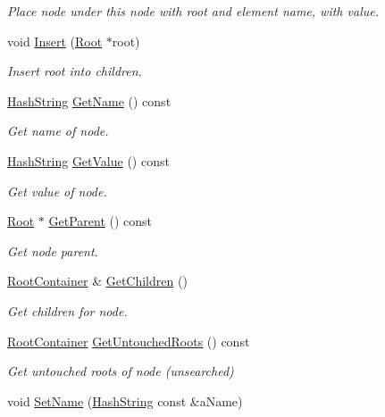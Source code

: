 \begin{DoxyCompactItemize}
\begin{DoxyCompactList}\small\item\em Place node under this node with root and element name, with value. \end{DoxyCompactList}\item 
void \hyperlink{classRoot_a60275ee59c14bae93b173067a9186dab}{Insert} (\hyperlink{classRoot}{Root} $\ast$root)
\begin{DoxyCompactList}\small\item\em Insert root into children. \end{DoxyCompactList}\item 
\hyperlink{classHashString}{Hash\+String} \hyperlink{classRoot_a97bcc25c8b962a681cb53096b0585a28}{Get\+Name} () const 
\begin{DoxyCompactList}\small\item\em Get name of node. \end{DoxyCompactList}\item 
\hyperlink{classHashString}{Hash\+String} \hyperlink{classRoot_ab1c77a4b9fbc54ace8ec611fdc5b150d}{Get\+Value} () const 
\begin{DoxyCompactList}\small\item\em Get value of node. \end{DoxyCompactList}\item 
\hyperlink{classRoot}{Root} $\ast$ \hyperlink{classRoot_a3e976ce215650faeda13959b75764108}{Get\+Parent} () const 
\begin{DoxyCompactList}\small\item\em Get node parent. \end{DoxyCompactList}\item 
\hyperlink{Root_8h_aba37b6ece0d9fb5495482ccd0e0f272e}{Root\+Container} \& \hyperlink{classRoot_a02a74cccccdd6627072949b64551e58a}{Get\+Children} ()
\begin{DoxyCompactList}\small\item\em Get children for node. \end{DoxyCompactList}\item 
\hyperlink{Root_8h_aba37b6ece0d9fb5495482ccd0e0f272e}{Root\+Container} \hyperlink{classRoot_a79e5805c907dbf98b466bc2044f7496b}{Get\+Untouched\+Roots} () const 
\begin{DoxyCompactList}\small\item\em Get untouched roots of node (unsearched) \end{DoxyCompactList}\item 
void \hyperlink{classRoot_a990736feccfa4b7f409e2bbf7203ea58}{Set\+Name} (\hyperlink{classHashString}{Hash\+String} const \&a\+Name)

\end{DoxyCompactItemize}

